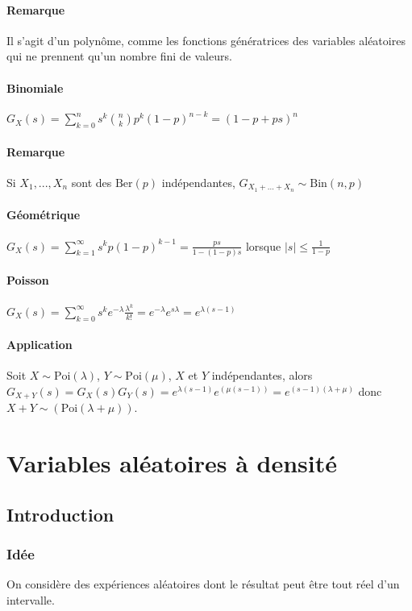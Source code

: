 \documentclass[a4paper,10pt]{book} %
\newcommand\abs[1]{\left|#1\right|}
\newcommand{\Ber}{\mathrm{Ber}} %
\newcommand{\Bin}{\mathrm{Bin}} %
\newcommand{\Poi}{\mathrm{Poi}} %
\begin{document}
\subsubsection{Remarque}
Il s'agit d'un polynôme, comme les fonctions génératrices des variables aléatoires qui ne prennent qu'un nombre fini de valeurs.

\subsubsection{Binomiale}
$\displaystyle G_X(s)=\sum_{k=0}^ns^k\binom{n}{k}p^k(1-p)^{n-k}=(1-p+ps)^n$

\subsubsection{Remarque}
Si $X_1,...,X_n$ sont des $\Ber(p)$ indépendantes, $G_{X_1+...+X_n}\sim\Bin(n,p)$

\subsubsection{Géométrique}
$\displaystyle G_X(s)=\sum_{k=1}^\infty s^kp(1-p)^{k-1}=\frac{ps}{1-(1-p)s}$ lorsque $\displaystyle \abs{s}\leq\frac{1}{1-p}$

\subsubsection{Poisson}
$\displaystyle G_X(s)=\sum_{k=0}^\infty s^ke^{-\lambda}\frac{\lambda^k}{k!}=e^{-\lambda}e^{s\lambda}=e^{\lambda(s-1)}$

\subsubsection{Application}
Soit $X\sim\Poi(\lambda)$, $Y\sim\Poi(\mu)$, $X$ et $Y$ indépendantes, alors\\$\displaystyle G_{X+Y}(s)=G_X(s)G_Y(s)=e^{\lambda(s-1)}e^{(\mu(s-1))}=e^{(s-1)(\lambda+\mu)}$
donc $X+Y \sim(\Poi(\lambda+\mu))$.



\chapter{Variables aléatoires à densité}
\section{Introduction}
\subsection{Idée}
On considère des expériences aléatoires dont le résultat peut être tout réel d'un intervalle.
\end{document}
